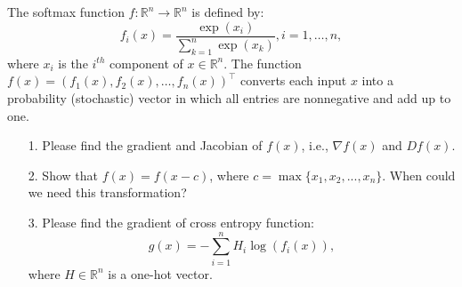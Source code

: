 \documentclass[11pt,letter,notitlepage]{article}
\begin{document}
\begin{exercise}
	The softmax function $f:\mathbb{R}^n\rightarrow\mathbb{R}^n$ is defined by:
	$$f_i(x)=\frac{\exp(x_i)}{\sum_{k=1}^{n}\exp(x_k)}, i=1,\ldots,n,$$
	where $x_i$ is the $i^{th}$ component of $x\in\mathbb{R}^n$. The function  $f(x)=(f_1(x),f_2(x),\ldots,f_n(x))^{\top}$ converts each input $x$ into a probability (stochastic) vector in which all entries are nonnegative and add up to one.
	\begin{itemize}
		\item[1.] Please find the gradient and Jacobian of $f(x)$, i.e., $\nabla f(x)$ and $Df(x)$.

		\item[2.] Show that $f(x)=f(x-c)$, where $c=\max\{x_1,x_2,...,x_n\}$. When could we need this transformation?

		\item[3.] Please find the gradient of cross entropy function:
		      $$g(x)=-\sum_{i=1}^{n}H_i\log(f_i(x)),$$
		      where $H\in\mathbb{R}^n$ is a one-hot vector.
	\end{itemize}
\end{exercise}

\begin{solution}

\end{solution}

\newpage
\end{document}
